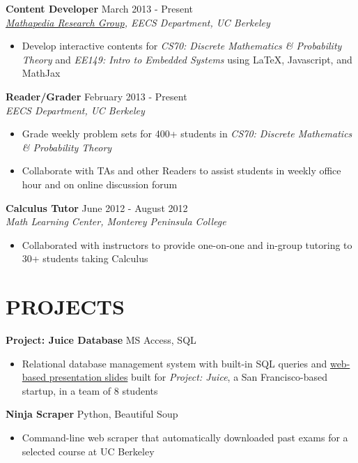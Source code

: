 \documentclass[margin]{res}
\begin{document}
\begin{resume}
\textbf{Content Developer} \hfill March 2013 - Present \\
\textit{\href{https://mathapedia.com/}{Mathapedia Research Group}, EECS Department, UC Berkeley} \smallskip
\begin{itemize}[leftmargin=10pt]
\item Develop interactive contents for \textit{CS70: Discrete Mathematics \& Probability Theory} and \textit{EE149: Intro to Embedded Systems} using \LaTeX{}, Javascript, and MathJax
\end{itemize}

\textbf{Reader/Grader} \hfill February 2013 - Present\\
\textit{EECS Department, UC Berkeley} \smallskip
\begin{itemize}[leftmargin=10pt]
\item Grade weekly problem sets for 400+ students in \textit{CS70: Discrete Mathematics \& Probability Theory}
\item Collaborate with TAs and other Readers to assist students in weekly office hour and on online discussion forum 
\end{itemize}

\textbf{Calculus Tutor} \hfill June 2012 - August 2012 \\
\textit{Math Learning Center, Monterey Peninsula College} \smallskip
\begin{itemize}[leftmargin=10pt]
\item Collaborated with instructors to provide one-on-one and in-group tutoring to 30+ students taking Calculus
\end{itemize}

\section{PROJECTS} 
\textbf{Project: Juice Database} \hfill MS Access, SQL
\begin{itemize}[leftmargin=10pt]
\item Relational database management system with built-in SQL queries and \href{http://kqdtran.github.io/course/ieor115/slide.html}{web-based presentation slides} built for \textit{Project: Juice}, a San Francisco-based startup, in a team of 8 students
\end{itemize}

\textbf{Ninja Scraper} \hfill Python, Beautiful Soup
\begin{itemize}[leftmargin=10pt]
\item Command-line web scraper that automatically downloaded past exams for a selected course at UC Berkeley 
\end{itemize}


\end{resume}
\end{document}
